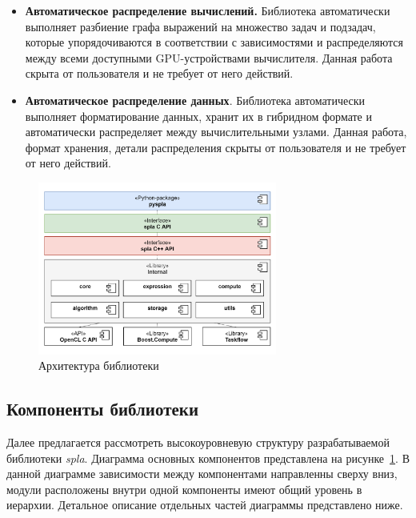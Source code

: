 \begin{itemize}
    \item \textbf{Автоматическое распределение вычислений.} Библиотека автоматически выполняет разбиение графа выражений на множество задач и подзадач, которые упорядочиваются в соответствии с зависимостями и распределяются между всеми доступными GPU-устройствами вычислителя. Данная работа скрыта от пользователя и не требует от него действий. 
   
    \item \textbf{Автоматическое распределение данных}. Библиотека автоматически выполняет форматирование данных, хранит их в гибридном формате и автоматически распределяет между вычислительными узлами.  Данная работа, формат хранения, детали распределения скрыты от пользователя и не требует от него действий.
\end{itemize}

\begin{figure}[h]
    \centering
    \includegraphics[width=0.7\textwidth]{images/spla_architecture.png}
    \caption{Архитектура библиотеки}
    \label{fig:spla_architecture}
\end{figure}

\subsection{Компоненты библиотеки}

Далее предлагается рассмотреть высокоуровневую структуру разрабатываемой библиотеки \textit{spla}. Диаграмма основных компонентов представлена на рисунке~\ref{fig:spla_architecture}. В данной диаграмме зависимости между компонентами направленны сверху вниз, модули расположены внутри одной компоненты имеют общий уровень в иерархии. Детальное описание отдельных частей диаграммы представлено ниже.

